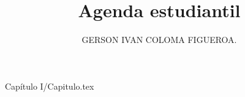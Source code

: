 \documentclass[11pt, letterpaper]{book}
\author{GERSON IVAN COLOMA FIGUEROA.}
\title{Agenda estudiantil}
\begin{document}
    
    
    
    \tableofcontents
     {Capítulo I/Capitulo.tex}
	
    
    
    

 
\end{document}
